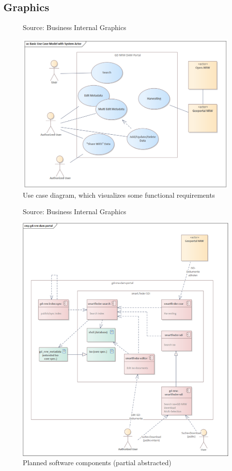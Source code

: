 \documentclass[11pt, titlepage, a4paper]{article}
\newcommand{\source}[1]{\caption*{Source: {#1}} }
\begin{document}
\begin{appendices}
    \section{Graphics}
    \begin{figure}[H]
        \caption{Use case diagram, which visualizes some functional requirements}
        \source{Business Internal Graphics \cite{conterraGDNRWMetaDAMPort2024}}
        \label{fig:usecase}
        \includegraphics[width=16cm]{usecase_diagramm.png}
        \centering
    \end{figure}
    \begin{figure}[H]
        \caption{Planned software components (partial abstracted)}
        \source{Business Internal Graphics \cite{conterraGDNRWMetaDAMPort2024}}
        \label{fig:components}
        \includegraphics[width=16cm]{components_.png}
        \centering
    \end{figure}


\end{appendices}
\end{document}
